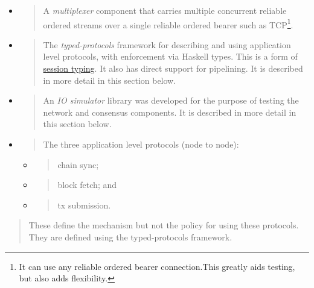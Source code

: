 \documentclass[11pt,a4paper]{article}
\begin{document}
\begin{itemize}
\item
  \begin{quote}
  A \emph{multiplexer} component that carries multiple concurrent
  reliable ordered streams over a single reliable ordered bearer such as
  TCP\footnote{It can use any reliable ordered bearer connection.This
    greatly aids testing, but also adds flexibility.}.
  \end{quote}
\item
  \begin{quote}
  The \emph{typed-protocols} framework for describing and using
  application level protocols, with enforcement via Haskell types. This
  is a form of \href{https://groups.inf.ed.ac.uk/abcd/}{{session
  typing}}. It also has direct support for pipelining. It is described
  in more detail in this section below.
  \end{quote}
\item
  \begin{quote}
  An \emph{IO simulator} library was developed for the purpose of
  testing the network and consensus components. It is described in more
  detail in this section below.
  \end{quote}
\item
  \begin{quote}
  The three application level protocols (node to node):
  \end{quote}

  \begin{itemize}
  \item
    \begin{quote}
    chain sync;
    \end{quote}
  \item
    \begin{quote}
    block fetch; and
    \end{quote}
  \item
    \begin{quote}
    tx submission.
    \end{quote}
  \end{itemize}
\end{itemize}

\begin{quote}
These define the mechanism but not the policy for using these protocols.
They are defined using the typed-protocols framework.
\end{quote}
\end{document}
